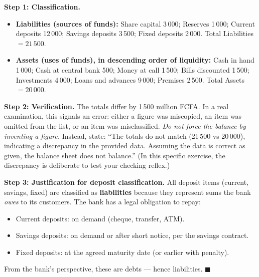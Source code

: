 \documentclass[11pt]{article}
\begin{document}
\begin{corrige}[Exercise 1]
\textbf{Step 1: Classification.}
\begin{itemize}
\item \textbf{Liabilities (sources of funds):} Share capital 3\,000; Reserves 1\,000; Current deposits 12\,000; Savings deposits 3\,500; Fixed deposits 2\,000. Total Liabilities $= 21\,500$.
\item \textbf{Assets (uses of funds), in descending order of liquidity:} Cash in hand 1\,000; Cash at central bank 500; Money at call 1\,500; Bills discounted 1\,500; Investments 4\,000; Loans and advances 9\,000; Premises 2\,500. Total Assets $= 20\,000$.
\end{itemize}

\textbf{Step 2: Verification.} The totals differ by 1\,500 million FCFA. In a real examination, this signals an error: either a figure was miscopied, an item was omitted from the list, or an item was misclassified. \emph{Do not force the balance by inventing a figure.} Instead, state: ``The totals do not match (21\,500 vs 20\,000), indicating a discrepancy in the provided data. Assuming the data is correct as given, the balance sheet does not balance.'' (In this specific exercise, the discrepancy is deliberate to test your checking reflex.)

\textbf{Step 3: Justification for deposit classification.} All deposit items (current, savings, fixed) are classified as \textbf{liabilities} because they represent sums the bank \emph{owes} to its customers. The bank has a legal obligation to repay:
\begin{itemize}
\item Current deposits: on demand (cheque, transfer, ATM).
\item Savings deposits: on demand or after short notice, per the savings contract.
\item Fixed deposits: at the agreed maturity date (or earlier with penalty).
\end{itemize}
From the bank's perspective, these are debts — hence liabilities. $\blacksquare$
\end{corrige}
\end{document}
